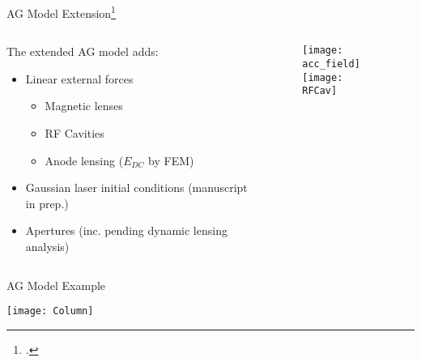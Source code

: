 \begin{frame}{AG Model Extension\footcite{berger_semi-analytic_2010}}
\begin{columns}
  \begin{column}{0.54\linewidth}
    The extended AG model adds:
    \begin{itemize}
      \item Linear external forces
      \begin{itemize}
        \item<2-> Magnetic lenses
        \item<2-> RF Cavities
        \item<3-> Anode lensing ($E_{DC}$ by FEM)
      \end{itemize}
      \item<4-> Gaussian laser initial conditions (manuscript in prep.)
      \item<5-> Apertures (inc. pending dynamic lensing analysis)
    \end{itemize}
  \end{column}
  \begin{column}{0.4\linewidth}
    \begin{figure}
      \centering
      \texttt{[image: acc\_field]}\\
      \texttt{[image: RFCav]}
    \end{figure}
  \end{column}
\end{columns}
\end{frame}

\begin{frame}{AG Model Example}
  \begin{center}
    \texttt{[image: Column]}
  \end{center}
\end{frame}